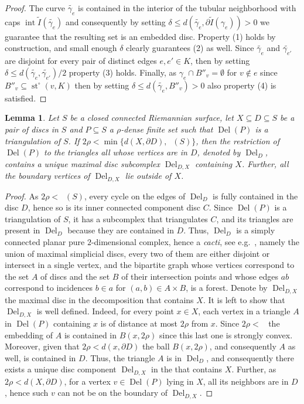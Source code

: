 \documentclass[11pt]{article}
\newtheorem{lemma}[theorem]{Lemma}
\numberwithin{claimcounter}{theorem}
\theoremstyle{remark}
\theoremstyle{definition}
\numberwithin{theorem}{section}
\DeclareMathOperator{\st}{st}
\DeclareMathOperator{\interior}{int}
\DeclareMathOperator{\rscv}{r_{scv}}
\DeclareMathOperator{\Del}{Del}
\begin{document}
\begin{proof}
    The curve $\widetilde{\gamma_e}$ is contained in the interior of the tubular neighborhood with caps $\interior\widetilde{I}(\widetilde{\gamma_e})$ and consequently by setting $\delta \leq d(\widetilde{\gamma_e},\partial \widetilde{I}(\gamma_e)) > 0$ we guarantee that the resulting set is an embedded disc. Property (1) holds by construction, and small enough $\delta$ clearly guarantees (2) as well. 
%
    Since $\widetilde{\gamma_e}$ and $\widetilde{\gamma_{e'}}$ are disjoint for every pair of distinct edges $e,e'\in K$, then by setting $\delta 
    \leq d(\widetilde{\gamma_e},\widetilde{\gamma_{e'}})/2$ property (3) holds. 
%
    Finally, as $\gamma_e \cap B''_v = \emptyset$ for $v\notin e$ since $B''_v\subseteq \st^\circ(v,K)$ then by setting $\delta \leq d(\widetilde{\gamma_e},B''_v)>0$ also property (4) is satisfied.
\end{proof}
%
\begin{lemma}
    \label{l:del-neigh}
    Let $S$ be a closed connected Riemannian surface, 
    let $X \subseteq D\subseteq S$ be a pair of discs in $S$ and $P\subseteq S$ a $\rho$-dense finite set such that $\Del(P)$ is a triangulation of $S$. 
    If $2\rho < \min \{d(X,\partial D), \rscv(S) \}$, then the restriction of $\Del(P)$ to the triangles all whose vertices are in $D$, denoted by $\Del_D$, 
    contains a unique maximal disc subcomplex $\Del_{D,X}$ containing $X$. Further, all the boundary vertices of $\Del_{D,X}$ lie outside of $X$.
\end{lemma}
%
\begin{proof}
As $2\rho < \rscv(S)$,
every cycle on the edges of $\Del_D$ is fully contained in the disc $D$,
hence so is its inner connected component disc $C$. Since $\Del(P)$ is a triangulation of $S$, it has a subcomplex that triangulates $C$, and its triangles are present in $\Del_D$ because they are contained in $D$.
Thus, $\Del_D$ is a simply connected planar pure $2$-dimensional complex, hence a \emph{cacti}, see e.g.~\cite{cacti-cohen2002homotopy}, namely the union of maximal simplicial discs, every two of them are either disjoint or intersect in a single vertex, and the bipartite graph whose vertices correspond to the set $A$ of discs and the set $B$ of their intersection points and whose edges $ab$ correspond to incidences $b\in a$ for $(a,b)\in A\times B$, is a forest.
%
Denote by $\Del_{D,X}$ the maximal disc in the  decomposition that contains $X$. 
It is left to show that $\Del_{D,X}$ is well defined. Indeed, for every point 
$x\in X$, each vertex in a triangle $A$ in $\Del(P)$ containing $x$ is of distance at most $2\rho$ from $x$. Since $2\rho <\rscv$ the embedding of $A$ is contained in $B(x,2\rho)$ since this last one is strongly convex. Moreover, given that $2\rho < d(x,\partial D)$ the ball $B(x,2\rho)$, and consequently $A$ as well, is contained in $D$. Thus, the triangle $A$ is in $\Del_D$, and consequently there exists a unique disc component $\Del_{D,X}$ in the  that contains $X$. 
%
Further, as $2\rho < d(X,\partial D)$, for a vertex $v\in\Del(P)$ lying in $X$, all its neighbors are in $D$, hence such $v$ can not be on the boundary of $\Del_{D,X}$.
\end{proof}
\end{document}

